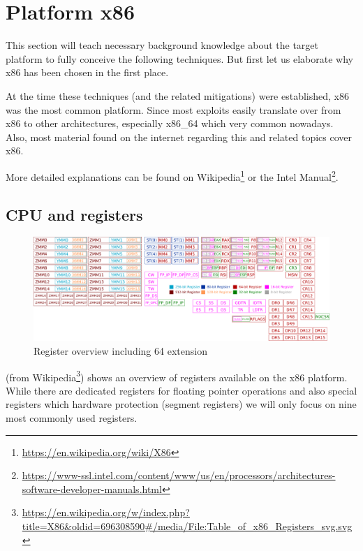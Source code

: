 \documentclass[article]{uibk}
\begin{document}
\section{Platform x86}

This section will teach necessary background knowledge about the target
platform to fully conceive the following techniques. But first let us elaborate
why x86 has been chosen in the first place.

At the time these techniques (and the related mitigations) were established,
x86 was the most common platform. Since most exploits easily translate over
from x86 to other architectures, especially x86\_64 which very common nowadays.
Also, most material found on the internet regarding this and related topics
cover x86.

More detailed explanations can be found on
Wikipedia\footnote{\url{https://en.wikipedia.org/wiki/X86}} or the Intel
Manual\footnote{\url{https://www-ssl.intel.com/content/www/us/en/processors/architectures-software-developer-manuals.html}}.

\subsection{CPU and registers}

\begin{figure}[htpb]
    \centering
    \includegraphics[width=\textwidth]{gfx/x86_registers.pdf}
    \caption{Register overview including \SI{64}{\bit} extension}
    \label{fig:registers}
\end{figure}

 (from
Wikipedia\footnote{\url{https://en.wikipedia.org/w/index.php?title=X86&oldid=696308590\#/media/File:Table_of_x86_Registers_svg.svg}})
shows an overview of registers available on the x86 platform. While there are
dedicated registers for floating pointer operations and also special registers
which hardware protection (segment registers) we will only focus on nine most
commonly used registers.
\end{document}
